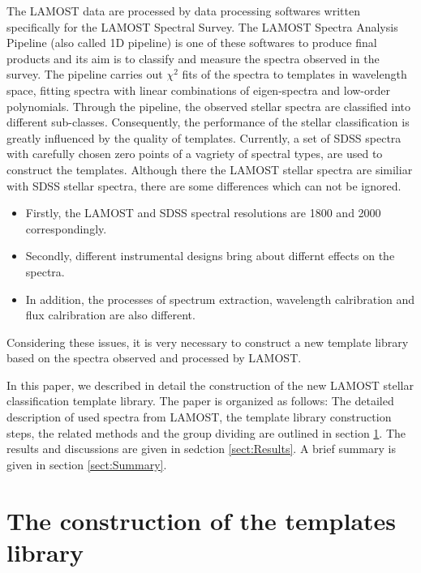 \documentclass[referee]{raa}            %
\begin{document}
The LAMOST data are processed by data processing softwares written specifically for the LAMOST Spectral Survey.
The LAMOST Spectra Analysis Pipeline (also called 1D pipeline) \citep{luo2001steps,luo2004design,luo2008automated,wang2010calibration,luo2012data} is one of these softwares to produce final products
and its aim is to classify and measure the spectra observed in the survey.
The pipeline carries out $\chi^2$ fits of the spectra to templates in wavelength space,
fitting spectra with linear combinations of eigen-spectra and low-order polynomials.
Through the pipeline, the observed stellar spectra are classified into different sub-classes.
Consequently, the performance of the stellar classification is greatly influenced by the quality of templates.
Currently, a set of SDSS spectra with carefully chosen zero points of a vagriety of spectral types,
are used to construct the templates\citep{wang2010calibration}.
Although there the LAMOST stellar spectra are similiar with SDSS stellar spectra, there are some differences which can not be ignored.
\begin{itemize}
\item Firstly, the  LAMOST and SDSS spectral resolutions are 1800 and 2000 correspondingly.
\item Secondly, different instrumental designs bring about differnt effects on the spectra.
\item In addition, the processes of spectrum extraction, wavelength calribration and flux calribration \citep{bai2012lamost} are also different.
\end{itemize}
Considering these issues, it is very necessary to construct a new template library based on the  spectra  observed and processed by LAMOST.


In this paper, we described  in detail the construction of the new LAMOST stellar  classification template library.
The paper is organized as follows:
The detailed description of used spectra from LAMOST, the template library construction steps, the related methods and the group dividing are outlined in section \ref{sect:construction}.
The results and discussions are given in sedction \ref{sect:Results}.
A brief summary is given in section \ref{sect:Summary}.
\section{The construction of the templates library}
\label{sect:construction}
\end{document}
